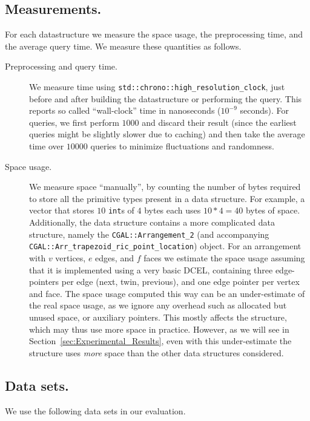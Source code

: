 \documentclass[twoside,leqno,twocolumn]{article}
\begin{document}
\subsection{Measurements.}
For each datastructure we measure the space usage, the preprocessing time, and the average query time. We measure these quantities as follows.
\begin{description}
  \item[Preprocessing and query time.] We measure time using \texttt{std::chrono::high\_resolution\_clock}, just before and after building the datastructure or performing the query. This reports so called ``wall-clock'' time in nanoseconds ($10^{-9}$ seconds). For queries, we first perform $\num{1000}$ and discard their result (since the earliest queries might be slightly slower due to caching) and then take the average time over $\num{10000}$ queries to minimize fluctuations and randomness.
  \item[Space usage.]  We measure space ``manually'', by counting the
    number of bytes required to store all the primitive types present
    in a data structure. For example, a vector that stores $10$
    \texttt{int}s of $4$ bytes each uses $10 * 4 = 40$ bytes of space.
    Additionally, the \cutting data structure contains a more
    complicated data structure, namely the
    \texttt{CGAL::Arrangement\_2} (and accompanying
    \texttt{CGAL::Arr\_trapezoid\_ric\_point\_location}) object. For
    an arrangement with $v$ vertices, $e$ edges, and $f$ faces we
    estimate the space usage assuming that it is implemented using a
    very basic DCEL, containing three edge-pointers per edge (next,
    twin, previous), and one edge pointer per vertex and face. The
    space usage computed this way can be an under-estimate of the real
    space usage, as we ignore any overhead such as allocated but
    unused space, or auxiliary pointers. This mostly affects the
    \cutting structure, which may thus use more space in
    practice. However, as we will see in
    Section~\ref{sec:Experimental_Results}, even with this
    under-estimate the \cutting structure uses \emph{more} space than
    the other data structures considered.
\end{description}


\subsection{Data sets.}
We use the following data sets in our evaluation.
\end{document}
